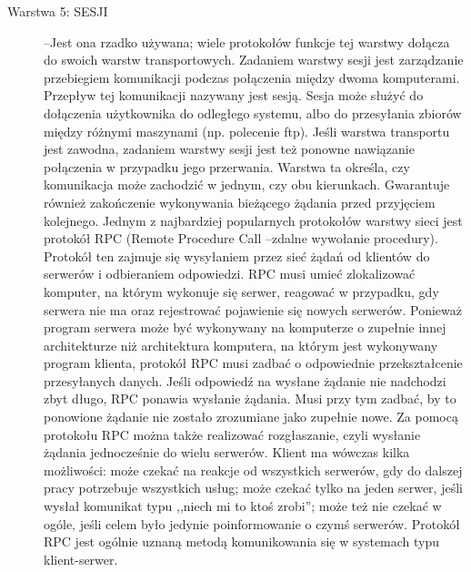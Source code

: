 \documentclass[a4paper,11pt]{article}
\begin{document}
\begin {description}
\item[Warstwa 5: SESJI]--Jest ona rzadko używana; wiele protokołów funkcje tej warstwy dołącza do swoich warstw transportowych. Zadaniem warstwy sesji jest zarządzanie przebiegiem komunikacji podczas połączenia między dwoma komputerami. Przepływ tej komunikacji nazywany jest sesją. Sesja może służyć do dołączenia użytkownika do odległego systemu, albo do przesyłania zbiorów między różnymi maszynami (np. polecenie ftp). Jeśli warstwa transportu jest zawodna, zadaniem warstwy sesji jest też ponowne nawiązanie połączenia w przypadku jego przerwania. Warstwa ta określa, czy komunikacja może zachodzić w jednym, czy obu kierunkach. Gwarantuje również zakończenie wykonywania bieżącego żądania przed przyjęciem kolejnego. Jednym z najbardziej popularnych protokołów warstwy sieci jest protokół RPC (Remote Procedure Call --zdalne wywołanie procedury). Protokół ten zajmuje się wysyłaniem przez sieć żądań od klientów do serwerów i odbieraniem odpowiedzi. RPC musi umieć zlokalizować komputer, na którym wykonuje się serwer, reagować w przypadku, gdy serwera nie ma oraz rejestrować pojawienie się nowych serwerów. Ponieważ program serwera może być wykonywany na komputerze o zupełnie innej architekturze niż architektura komputera, na którym jest wykonywany program klienta, protokół RPC musi zadbać o odpowiednie przekształcenie przesyłanych danych.  Jeśli odpowiedź na wysłane żądanie nie nadchodzi zbyt długo, RPC ponawia wysłanie żądania. Musi przy tym zadbać, by to ponowione żądanie nie zostało zrozumiane jako zupełnie nowe. Za pomocą protokołu RPC można także realizować rozgłaszanie, czyli wysłanie żądania jednocześnie do wielu serwerów. Klient ma wówczas kilka możliwości: może czekać na reakcje od wszystkich serwerów, gdy do dalszej pracy potrzebuje wszystkich usług; może czekać tylko na jeden serwer, jeśli wysłał komunikat typu ,,niech mi to ktoś zrobi''; może też nie czekać w ogóle, jeśli celem było jedynie poinformowanie o czymś serwerów. Protokół RPC jest ogólnie uznaną metodą komunikowania się w systemach typu klient-serwer. 


\end{description}
\end{document}
